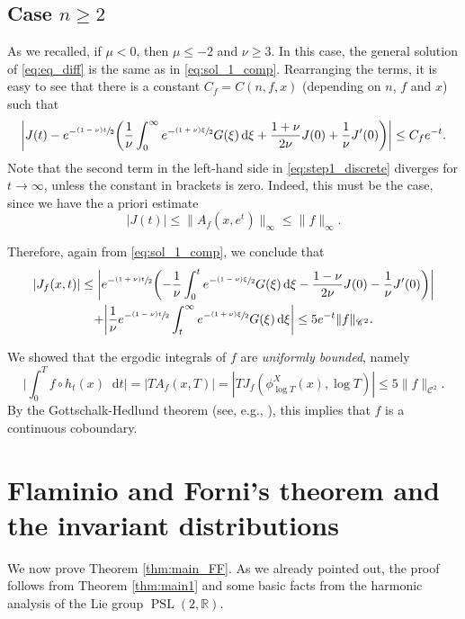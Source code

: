 \documentclass[JEP,XML,SOM,NoEqCountersInSection,Unicode,published]{cedram}
\newcommand{\tpsfrac}[3]{\sfrac{(#1)#3}{#2}}
\newcommand \R{\mathbb{R}}
\newcommand*{\diff}{\mathop{}\!\mathrm{d}}
\newcommand{\aver}[1]{A_{#1}(x,T)}
\DeclareMathOperator{\PSL}{PSL}
\theoremstyle{definition}
\begin{document}
\subsection{Case $n\geq 2$}

As we recalled, if $\mu <0$, then $\mu \leq -2$ and $\nu \geq 3$.
In this case, the general solution of \eqref{eq:eq_diff} is the same as in \eqref{eq:sol_1_comp}.
Rearranging the terms, it is easy to see that there is a constant $C_f= C(n,f,x)$ (depending on $n$, $f$ and $x$) such that
\begin{equation}\label{eq:step1_discrete}
\biggl\lvert J(t) - e^{-\tpsfrac{1-\nu}{2}t} \biggl(\frac{1}{\nu} \int_0^{\infty} e^{-\tpsfrac{1+\nu}{2}\xi} G(\xi) \diff \xi + \frac{1+\nu}{2\nu} J(0) + \frac{1}{\nu}J'(0) \biggr) \biggr\rvert \leq C_f e^{-t}.
\end{equation}
Note that the second term in the left-hand side in \eqref{eq:step1_discrete} diverges for $t \to \infty$, unless the constant in brackets is zero.
Indeed, this must be the case, since we have the a priori estimate
\[
|J(t)|\leq \|A_f(x,e^t) \|_\infty \leq \|f\|_\infty.
\]

Therefore, again from \eqref{eq:sol_1_comp}, we conclude that
\begin{multline}\label{eq:estimate_discrete}
|J_{f}(x,t)|\leq \biggl\lvert e^{-\tpsfrac{1+\nu}{2}t} \biggl(- \frac{1}{\nu} \int_0^t e^{-\tpsfrac{1-\nu}{2}\xi} G(\xi) \diff \xi - \frac{1-\nu}{2\nu} J(0) - \frac{1}{\nu}J'(0) \biggr) \biggr\rvert \\
+ \biggl\lvert \frac{1}{\nu} e^{-\tpsfrac{1-\nu}{2}t} \int_t^{\infty} e^{-\tpsfrac{1+\nu}{2}\xi} G(\xi) \diff \xi \biggr\rvert
\leq 5e^{-t}\|f\|_{\mathscr{C}^2}.
\end{multline}

We showed that the ergodic integrals of $f$ are \emph{uniformly bounded}, namely
\[
\biggl\lvert \int_0^T f \circ h_t (x) \diff t \biggr\rvert = |T \aver{f}|= |T J_{f}(\phi^X_{\log T}(x), \log T)|\leq 5\|f\|_{\mathscr{C}^2}.
\]
By the Gottschalk-Hedlund theorem (see, e.g., \cite[Th.\,C]{McC}), this implies that $f$ is a continuous coboundary.

\section{Flaminio and Forni's theorem and the invariant distributions}\label{section:FF}

We now prove Theorem \ref{thm:main_FF}. As we already pointed out, the proof follows from Theorem \ref{thm:main1} and some basic facts from the harmonic analysis of the Lie group $\PSL(2,\R)$.
\end{document}
